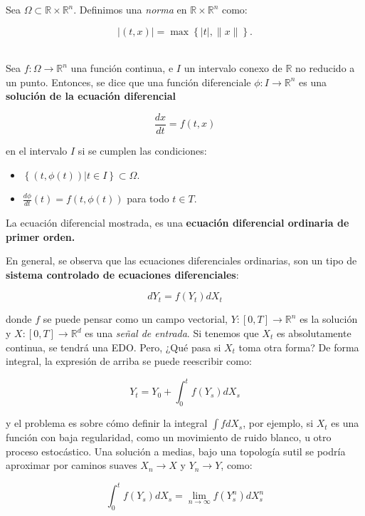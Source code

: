Sea $\Omega \subset \mathbb{R} \times \mathbb{R}^n$. Definimos una \textit{norma} en $\mathbb{R} \times \mathbb{R}^n$ como:

\[
	\lvert (t,x) \rvert = \max\left\{ \lvert t \rvert, \lVert x \rVert \right\}.
\] \\

\begin{boxDef}
	Sea $f: \Omega \rightarrow \mathbb{R}^n$ una función continua, e $I$ un intervalo conexo de $\mathbb{R}$ no reducido a un punto. Entonces, se dice que una función diferenciale $\phi: I \rightarrow \mathbb{R}^n$ es una \textbf{solución de la ecuación diferencial}

	\[
		\frac{dx}{dt} = f(t, x)
	\]

	en el intervalo $I$ si se cumplen las condiciones:

	\begin{itemize}
		\item $\left\{ (t, \phi(t) ) \vert t \in I  \right\} \subset \Omega$.
		\item $\frac{d\phi}{dt} (t) = f(t, \phi(t))$ para todo $t \in T$. 
	\end{itemize}

	La ecuación diferencial mostrada, es una \textbf{ecuación diferencial ordinaria de primer orden.}

\end{boxDef}

En general, se observa que las ecuaciones diferenciales ordinarias, son un tipo de \textbf{sistema controlado de ecuaciones diferenciales}:

\[
	dY_t = f(Y_t) dX_t
\]

donde $f$ se puede pensar como un campo vectorial, $Y: [0, T] \rightarrow \mathbb{R}^n$ es la solución y $X: [0, T] \rightarrow \mathbb{R}^d$ es una \textit{señal de entrada}. Si tenemos que $X_t$ es absolutamente continua, se tendrá una EDO. Pero, ¿Qué pasa si $X_t$ toma otra forma? De forma integral, la expresión de arriba se puede reescribir como:

\[
	Y_t = Y_0 + \int_0^t f(Y_s) dX_s
\]

y el problema es sobre cómo definir la integral $\int f dX_s$, por ejemplo, si $X_t$ es una función con baja regularidad, como un movimiento de ruido blanco, u otro proceso estocástico. Una solución a medias, bajo una topología sutil se podría aproximar por caminos suaves $X_n \rightarrow X$ y $Y_n \rightarrow Y$, como:

\[
	\int_0^t f(Y_s) dX_s = \lim_{n \rightarrow \infty} f(Y^n_s) dX^n_s
\]

